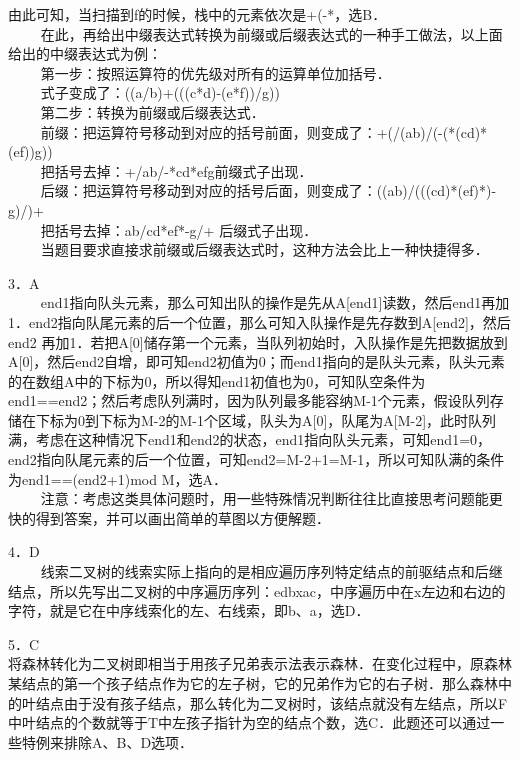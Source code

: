 由此可知，当扫描到f的时候，栈中的元素依次是+(-*，选B． \\
$\qquad$ 在此，再给出中缀表达式转换为前缀或后缀表达式的一种手工做法，以上面给出的中缀表达式为例： \\
$\qquad$ 第一步：按照运算符的优先级对所有的运算单位加括号． \\
$\qquad$ 式子变成了：((a/b)+(((c*d)-(e*f))/g)) \\
$\qquad$ 第二步：转换为前缀或后缀表达式． \\
$\qquad$ 前缀：把运算符号移动到对应的括号前面，则变成了：+(/(ab)/(-(*(cd)*(ef))g))  \\
$\qquad$ 把括号去掉：+/ab/-*cd*efg前缀式子出现． \\
$\qquad$ 后缀：把运算符号移动到对应的括号后面，则变成了：((ab)/(((cd)*(ef)*)-g)/)+  \\
$\qquad$ 把括号去掉：ab/cd*ef*-g/+ 后缀式子出现．  \\
$\qquad$ 当题目要求直接求前缀或后缀表达式时，这种方法会比上一种快捷得多．

3．A \\
$\qquad$ end1指向队头元素，那么可知出队的操作是先从A[end1]读数，然后end1再加1．end2指向队尾元素的后一个位置，那么可知入队操作是先存数到A[end2]，然后end2 再加1．若把A[0]储存第一个元素，当队列初始时，入队操作是先把数据放到A[0]，然后end2自增，即可知end2初值为0；而end1指向的是队头元素，队头元素的在数组A中的下标为0，所以得知end1初值也为0，可知队空条件为end1==end2；然后考虑队列满时，因为队列最多能容纳M-1个元素，假设队列存储在下标为0到下标为M-2的M-1个区域，队头为A[0]，队尾为A[M-2]，此时队列满，考虑在这种情况下end1和end2的状态，end1指向队头元素，可知end1=0，end2指向队尾元素的后一个位置，可知end2=M-2+1=M-1，所以可知队满的条件为end1==(end2+1)mod M，选A． \\
$\qquad$ 注意：考虑这类具体问题时，用一些特殊情况判断往往比直接思考问题能更快的得到答案，并可以画出简单的草图以方便解题．

4．D \\
$\qquad$ 线索二叉树的线索实际上指向的是相应遍历序列特定结点的前驱结点和后继结点，所以先写出二叉树的中序遍历序列：edbxac，中序遍历中在x左边和右边的字符，就是它在中序线索化的左、右线索，即b、a，选D．

5．C \\
将森林转化为二叉树即相当于用孩子兄弟表示法表示森林．在变化过程中，原森林某结点的第一个孩子结点作为它的左子树，它的兄弟作为它的右子树．那么森林中的叶结点由于没有孩子结点，那么转化为二叉树时，该结点就没有左结点，所以F中叶结点的个数就等于T中左孩子指针为空的结点个数，选C．此题还可以通过一些特例来排除A、B、D选项．

